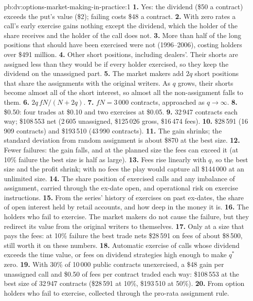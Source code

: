 \begin{solution}{pb:dv:options-market-making-in-practice:1}
\textbf{1.} Yes: the dividend (\$50 a contract) exceeds the put's value (\$2); failing costs \$48 a contract.
\textbf{2.} With zero rates a call's early exercise gains nothing except the dividend, which the holder of the share receives and the holder of the call does not.
\textbf{3.} More than half of the long positions that should have been exercised were not (1996--2006), costing holders over \$491 million.
\textbf{4.} Other short positions, including dealers'. Their shorts are assigned less than they would be if every holder exercised, so they keep the dividend
on the unassigned part.
\textbf{5.} The market makers add $2q$ short positions that share the assignments with the original writers. As $q$ grows, their shorts become almost all of
the short interest, so almost all the non-assignment falls to them.
\textbf{6.} $2q\,fN/(N+2q)$.
\textbf{7.} $fN=3\,000$ contracts, approached as $q\to\infty$.
\textbf{8.} \$0.50: four trades at \$0.10 and two exercises at \$0.05.
\textbf{9.} 32\,947 contracts each way; \$108\,553 net (2\,605 unassigned, \$125\,026 gross, \$16\,474 fees).
\textbf{10.} \$28\,591 (16\,909 contracts) and \$193\,510 (43\,990 contracts).
\textbf{11.} The gain shrinks; the standard deviation from random assignment is about \$870 at the best size.
\textbf{12.} Fewer failures: the gain falls, and at the planned size the fees can exceed it (at 10\% failure the best size is half as large).
\textbf{13.} Fees rise linearly with $q$, so the best size and the profit shrink; with no fees the play would capture all \$144\,000 at an unlimited size.
\textbf{14.} The share position of exercised calls and any imbalance of assignment, carried through the ex-date open, and operational risk on exercise instructions.
\textbf{15.} From the series' history of exercises on past ex-dates, the share of open interest held by retail accounts, and how deep in the money it is.
\textbf{16.} The holders who fail to exercise. The market makers do not cause the failure, but they redirect its value from the original writers to themselves.
\textbf{17.} Only at a size that pays the fees: at 10\% failure the best trade nets \$28\,591 on fees of about \$8\,500, still worth it on these numbers.
\textbf{18.} Automatic exercise of calls whose dividend exceeds the time value, or fees on dividend strategies high enough to make $q^*$ zero.
\textbf{19.} With 30\% of 10\,000 public contracts unexercised, a \$48 gain per unassigned call and \$0.50 of fees per contract traded each way: \$108\,553 at the best
size of 32\,947 contracts (\$28\,591 at 10\%, \$193\,510 at 50\%).
\textbf{20.} From option holders who fail to exercise, collected through the pro-rata assignment rule.
\end{solution}

